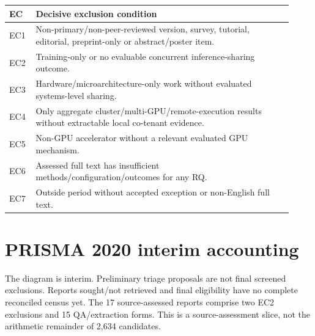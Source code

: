 \documentclass[12pt,a4paper]{article}
\begin{document}
{\small\begin{longtable}{>{\raggedright\arraybackslash}p{0.08\linewidth}>{\raggedright\arraybackslash}p{0.84\linewidth}}
\toprule
EC & Decisive exclusion condition\\\midrule
\endhead
EC1 & Non-primary/\allowbreak{}non-peer-reviewed version, survey, tutorial, editorial, preprint-only or abstract/\allowbreak{}poster item.\\
EC2 & Training-only or no evaluable concurrent inference-sharing outcome.\\
EC3 & Hardware/\allowbreak{}microarchitecture-only work without evaluated systems-level sharing.\\
EC4 & Only aggregate cluster/\allowbreak{}multi-GPU/\allowbreak{}remote-execution results without extractable local co-tenant evidence.\\
EC5 & Non-GPU accelerator without a relevant evaluated GPU mechanism.\\
EC6 & Assessed full text has insufficient methods/\allowbreak{}configuration/\allowbreak{}outcomes for any RQ.\\
EC7 & Outside period without accepted exception or non-English full text.\\
\bottomrule
\end{longtable}}


\section{PRISMA 2020 interim accounting}

The diagram is interim. Preliminary triage proposals are not final screened exclusions. Reports sought/\allowbreak{}not retrieved and final eligibility have no complete reconciled census yet. The 17 source-assessed reports comprise two EC2 exclusions and 15 QA/\allowbreak{}extraction forms. This is a source-assessment slice, not the arithmetic remainder of 2,634 candidates.


\begin{center}\end{center}
\end{document}
